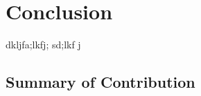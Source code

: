 \chapter{Conclusion}
\label{c:conclusion}

dkljfa;lkfj; sd;lkf j

\section{Summary of Contribution}
